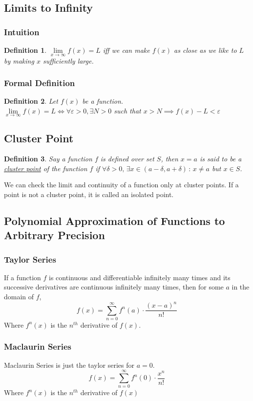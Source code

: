 \documentclass[14]{article}
\newtheorem{define}{Definition}
\theoremstyle{definition}
\theoremstyle{case}
\begin{document}
\subsection{Limits to Infinity}
\subsubsection{Intuition}
\begin{define}
$\lim\limits_{x \to \infty} f(x) = L$ iff we can make $f(x)$ as close as we like to $L$ by making $x$ sufficiently large.
\end{define}
\subsubsection{Formal Definition}
\begin{define}
Let $f(x)$ be a function.\\
$\lim\limits_{x \to \infty} f(x) = L \iff \forall \varepsilon > 0, \exists N > 0$ such that $x > N \implies f(x) - L < \varepsilon$ 
\end{define}
\subsection{Cluster Point}
\begin{define}
Say a function $f$ is defined over set $S$, then $x = a$ is said to be a \underline{cluster point} of the function $f$ if $\forall \delta > 0,\, \exists x \in (a - \delta, a + \delta)\, : \, x \neq a$ but $x \in S$.
\end{define}
We can check the limit and continuity of a function only at cluster points. If a point is not a cluster point, it is called an isolated point.
\subsection{Polynomial Approximation of Functions to Arbitrary Precision}
\subsubsection{Taylor Series}
If a function $f$ is continuous and differentiable infinitely many times and its successive derivatives are continuous infinitely many times, then for some $a$ in the domain of $f$,\\
\[f(x) = \sum\limits_{n=0}^{\infty} f^n(a) \cdot \dfrac{{(x-a)^n}}{n!}\]
Where $f^n(x)$ is the $n^{th}$ derivative of $f(x)$.
\subsubsection{Maclaurin Series}
Maclaurin Series is just the taylor series for $a = 0$.\\
\[f(x) = \sum\limits_{n=0}^{\infty} f^n(0) \cdot \dfrac{x^n}{n!}\]
Where $f^n(x)$ is the $n^{th}$ derivative of $f(x)$
\pagebreak
\end{document}
